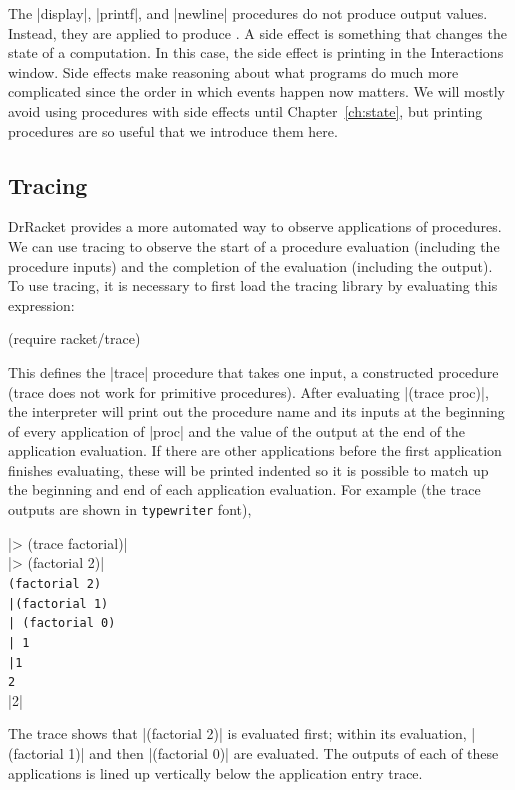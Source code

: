 \begin{schemeregion}
The \scheme|display|, \scheme|printf|, and \scheme|newline| procedures do not produce output values.  Instead, they are applied to produce .  A side effect is something that changes the state of a computation.  In this case, the side effect is printing in the Interactions window.  Side effects make reasoning about what programs do much more complicated since the order in which events happen now matters.  We will mostly avoid using procedures with side effects until Chapter~\ref{ch:state}, but printing procedures are so useful that we introduce them here.

\subsection{Tracing}

DrRacket provides a more automated way to observe applications of procedures.  We can use tracing to observe the start of a procedure evaluation (including the procedure inputs) and the completion of the evaluation (including the output).  To use tracing, it is necessary to first load the tracing library by evaluating this expression:
\begin{schemedisplay}
   (require racket/trace)
\end{schemedisplay}
This defines the \scheme|trace| procedure that takes one input, a constructed procedure (trace does not work for primitive procedures).  After evaluating \scheme|(trace proc)|, the interpreter will print out the procedure name and its inputs at the beginning of every application of \scheme|proc| and the value of the output at the end of the application evaluation.  If there are other applications before the first application finishes evaluating, these will be printed indented so it is possible to match up the beginning and end of each application evaluation.  For example (the trace outputs are shown in \verb+typewriter+ font),
\begin{code}
\scheme|> (trace factorial)|\\
\scheme|> (factorial 2)|\\
\verb+(factorial 2)+\\
\verb+|(factorial 1)+\\
\verb+| (factorial 0)+\\
\verb+| 1+\\
\verb+|1+\\
\verb+2+\\
\schemeresult|2|
\end{code}
The trace shows that \scheme|(factorial 2)| is evaluated first; within its evaluation, \scheme|(factorial 1)| and then \scheme|(factorial 0)| are evaluated.  The outputs of each of these applications is lined up vertically below the application entry trace.


\end{schemeregion}
